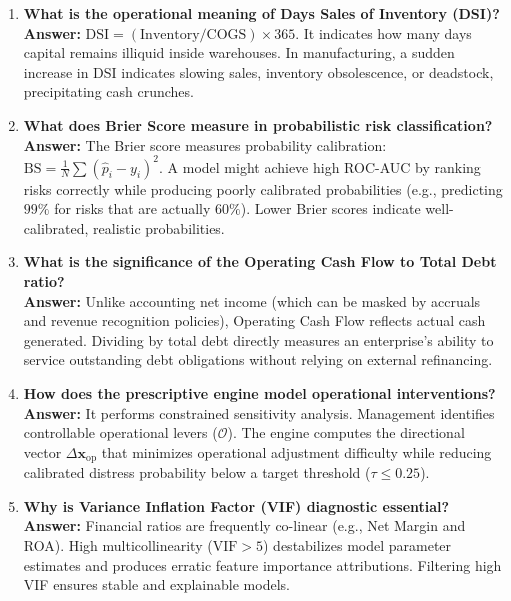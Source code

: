 \documentclass[11pt, a4paper]{article}
\begin{document}
\begin{enumerate}
    \item \textbf{What is the operational meaning of Days Sales of Inventory (DSI)?}\\
    \textbf{Answer:} $\text{DSI} = (\text{Inventory} / \text{COGS}) \times 365$. It indicates how many days capital remains illiquid inside warehouses. In manufacturing, a sudden increase in DSI indicates slowing sales, inventory obsolescence, or deadstock, precipitating cash crunches.
    
    \item \textbf{What does Brier Score measure in probabilistic risk classification?}\\
    \textbf{Answer:} The Brier score measures probability calibration: $\text{BS} = \frac{1}{N}\sum (\hat{p}_i - y_i)^2$. A model might achieve high ROC-AUC by ranking risks correctly while producing poorly calibrated probabilities (e.g., predicting $99\%$ for risks that are actually $60\%$). Lower Brier scores indicate well-calibrated, realistic probabilities.
    
    \item \textbf{What is the significance of the Operating Cash Flow to Total Debt ratio?}\\
    \textbf{Answer:} Unlike accounting net income (which can be masked by accruals and revenue recognition policies), Operating Cash Flow reflects actual cash generated. Dividing by total debt directly measures an enterprise's ability to service outstanding debt obligations without relying on external refinancing.
    
    \item \textbf{How does the prescriptive engine model operational interventions?}\\
    \textbf{Answer:} It performs constrained sensitivity analysis. Management identifies controllable operational levers ($\mathcal{O}$). The engine computes the directional vector $\Delta \mathbf{x}_{\text{op}}$ that minimizes operational adjustment difficulty while reducing calibrated distress probability below a target threshold ($\tau \le 0.25$).
    
    \item \textbf{Why is Variance Inflation Factor (VIF) diagnostic essential?}\\
    \textbf{Answer:} Financial ratios are frequently co-linear (e.g., Net Margin and ROA). High multicollinearity ($\text{VIF} > 5$) destabilizes model parameter estimates and produces erratic feature importance attributions. Filtering high VIF ensures stable and explainable models.
    

\end{enumerate}
\end{document}
